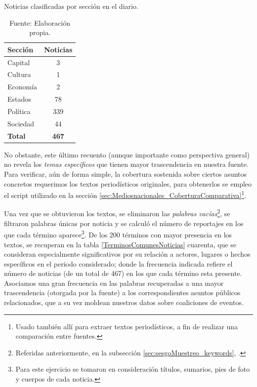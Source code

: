 \documentclass[letterpaper, 11pt]{book}
\theoremstyle{definition}
\theoremstyle{remark}
\begin{document}
\begin{table}[!hbt]
\center
\footnotesize
\caption{Noticias clasificadas por sección en el diario.}
\label{Secciones_Muestra_diarios}
\begin{tabular}{ | l | c | } 
\hline
\textbf{Sección} & \textbf{Noticias} \\
\hline
Capital & 3\\
\hline
Cultura & 1\\
\hline
Economía & 2\\
\hline
Estados & 78\\
\hline
Política & 339\\
\hline
Sociedad & 44\\
\hline
\textbf{Total} & \textbf{467}\\
\hline
\end{tabular}
\par\bigskip
\caption*{\small Fuente: Elaboración propia.}
\vspace{-2em}
\end{table}


No obstante, este último recuento (aunque importante como perspectiva general) no revela los \emph{temas específicos} que tienen mayor trascendencia en nuestra fuente. 
Para verificar, aún de forma simple, la cobertura sostenida sobre ciertos asuntos concretos requerimos los textos periodísticos originales, para obtenerlos se empleo el script utilizado en la sección \ref{sec:Mediosnacionales_CoberturaComparativa}\footnote{
    Usado también allí para extraer textos periodísticos, a fin de realizar una comparación entre fuentes.
}. 


Una vez que se obtuvieron los textos, se eliminaron las \emph{palabras vacías}\footnote{
    Referidas anteriormente, en la subsección \ref{sec:sesgoMuestreo_keywords}, .
}, 
se filtraron palabras únicas por noticia y se calculó el número de reportajes en los que cada término aparece\footnote{
    Para este ejercicio se tomaron en consideración títulos, sumarios, pies de foto y cuerpos de cada noticia.
}. 
De los 200 términos con mayor presencia en los textos, se recuperan en la tabla \ref{TerminosComunesNoticias} cuarenta, que se consideran especialmente significativos por su relación a actores, lugares o hechos específicos en el periodo considerado; donde la frecuencia indicada refiere el número de noticias (de un total de 467) en los que cada término esta presente.
Asociamos una gran frecuencia en las palabras recuperadas a una mayor trascendencia (otorgada por la fuente) a los correspondientes asuntos públicos relacionados, que a su vez moldean nuestros datos sobre coaliciones de eventos. 
\end{document}
